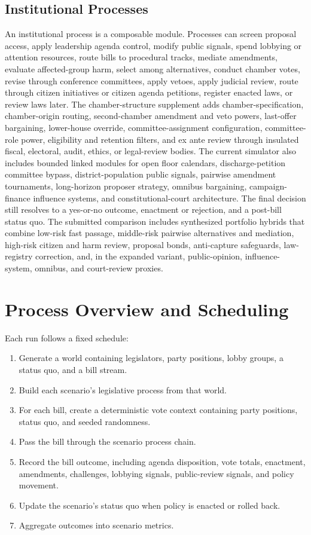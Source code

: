 \documentclass[manuscript,review,anonymous]{acmart}
\begin{document}
\subsection{Institutional Processes}

An institutional process is a composable module. Processes can screen proposal access, apply leadership agenda control, modify public signals, spend lobbying or attention resources, route bills to procedural tracks, mediate amendments, evaluate affected-group harm, select among alternatives, conduct chamber votes, revise through conference committees, apply vetoes, apply judicial review, route through citizen initiatives or citizen agenda petitions, register enacted laws, or review laws later. The chamber-structure supplement adds chamber-specification, chamber-origin routing, second-chamber amendment and veto powers, last-offer bargaining, lower-house override, committee-assignment configuration, committee-role power, eligibility and retention filters, and ex ante review through insulated fiscal, electoral, audit, ethics, or legal-review bodies. The current simulator also includes bounded linked modules for open floor calendars, discharge-petition committee bypass, district-population public signals, pairwise amendment tournaments, long-horizon proposer strategy, omnibus bargaining, campaign-finance influence systems, and constitutional-court architecture. The final decision still resolves to a yes-or-no outcome, enactment or rejection, and a post-bill status quo. The submitted comparison includes synthesized portfolio hybrids that combine low-risk fast passage, middle-risk pairwise alternatives and mediation, high-risk citizen and harm review, proposal bonds, anti-capture safeguards, law-registry correction, and, in the expanded variant, public-opinion, influence-system, omnibus, and court-review proxies.

\section{Process Overview and Scheduling}

Each run follows a fixed schedule:

\begin{enumerate}
  \item Generate a world containing legislators, party positions, lobby groups, a status quo, and a bill stream.
  \item Build each scenario's legislative process from that world.
  \item For each bill, create a deterministic vote context containing party positions, status quo, and seeded randomness.
  \item Pass the bill through the scenario process chain.
  \item Record the bill outcome, including agenda disposition, vote totals, enactment, amendments, challenges, lobbying signals, public-review signals, and policy movement.
  \item Update the scenario's status quo when policy is enacted or rolled back.
  \item Aggregate outcomes into scenario metrics.
\end{enumerate}
\end{document}

